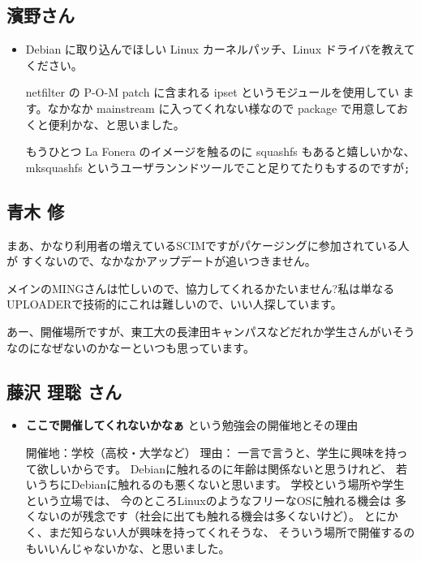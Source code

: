 \documentclass[mingoth,a4paper]{jsarticle}
\begin{document}
\subsection{濱野さん}
\begin{itemize}
\item Debian に取り込んでほしい Linux カーネルパッチ、Linux ドライバを教えてください。

netfilter の P-O-M patch に含まれる ipset というモジュールを使用してい
ます。なかなか mainstream に入ってくれない様なので package で用意してお
くと便利かな、と思いました。

もうひとつ La Fonera のイメージを触るのに squashfs もあると嬉しいかな、
mksquashfs というユーザランンドツールでこと足りてたりもするのですが\tt{}\tt{};
\end{itemize}

\subsection{青木 修}
まあ、かなり利用者の増えているSCIMですがパケージングに参加されている人が
すくないので、なかなかアップデートが追いつきません。

メインのMINGさんは忙しいので、協力してくれるかたいません?私は単なる
UPLOADERで技術的にこれは難しいので、いい人探しています。

あー、開催場所ですが、東工大の長津田キャンパスなどだれか学生さんがいそう
なのになぜないのかなーといつも思っています。

\subsection{藤沢 理聡 さん}
\begin{itemize}
\item {\bf ここで開催してくれないかなぁ} という勉強会の開催地とその理由

開催地：学校（高校・大学など）
理由：
一言で言うと、学生に興味を持って欲しいからです。
Debianに触れるのに年齢は関係ないと思うけれど、
若いうちにDebianに触れるのも悪くないと思います。
学校という場所や学生という立場では、
今のところLinuxのようなフリーなOSに触れる機会は
多くないのが残念です（社会に出ても触れる機会は多くないけど）。
とにかく、まだ知らない人が興味を持ってくれそうな、
そういう場所で開催するのもいいんじゃないかな、と思いました。
\end{itemize}
\end{document}
